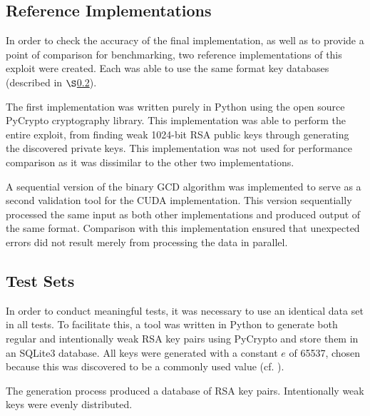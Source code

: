 \documentclass[12pt]{ucthesis}
\begin{document}
\subsection{Reference Implementations}
In order to check the accuracy of the final implementation, as well as to 
provide a point of comparison for benchmarking, two reference implementations 
of this exploit were created. Each was able to use the same format key 
databases (described in $\S$\ref{sec:testSets}). 

The first implementation was written purely in Python using the open source
PyCrypto cryptography library. %
This 
implementation was able to perform the entire exploit, from finding 
weak 1024-bit RSA 
public keys through generating the discovered private keys. 
This implementation was not used for performance 
comparison as it was dissimilar to the other two implementations.

A sequential version of the binary GCD algorithm was implemented to serve as a 
second validation tool for the CUDA implementation. This version sequentially 
processed the same input as both other implementations and produced output of the 
same format. Comparison with this implementation ensured that unexpected errors 
did not result merely from processing the data in parallel.

\subsection{Test Sets}
\label{sec:testSets}
In order to conduct meaningful tests, it was necessary to use an identical 
data set in all tests. To facilitate this, a tool was written in Python to 
generate both regular and intentionally weak RSA key pairs using PyCrypto and store them in an SQLite3 database. All keys were generated with a 
constant $e$ of 65537, chosen because this was discovered to be a commonly used 
value (cf. \cite{lenstra:ron}).

The generation process produced a database of RSA key pairs. 
Intentionally weak keys were evenly distributed. 
\end{document}
